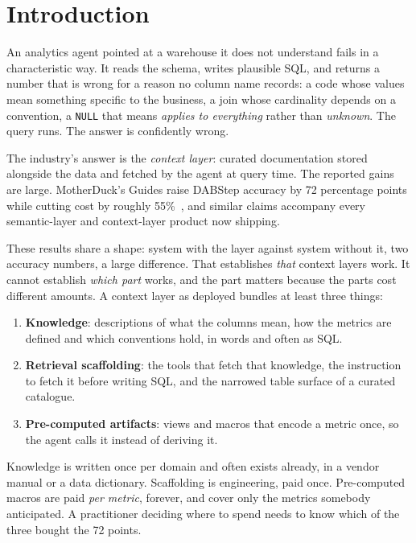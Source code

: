 \section{Introduction}
\label{sec:intro}

An analytics agent pointed at a warehouse it does not understand fails in a
characteristic way. It reads the schema, writes plausible SQL, and returns a
number that is wrong for a reason no column name records: a code whose values
mean something specific to the business, a join whose cardinality depends on a
convention, a \texttt{NULL} that means \emph{applies to everything} rather than
\emph{unknown}. The query runs. The answer is confidently wrong.

The industry's answer is the \emph{context layer}: curated documentation
stored alongside the data and fetched by the agent at query time. The reported
gains are large. MotherDuck's Guides raise DABStep accuracy by 72 percentage
points while cutting cost by roughly 55\%~\cite{motherduck-guides}, and
similar claims accompany every semantic-layer and context-layer product now
shipping.

These results share a shape: system with the layer against system without
it, two accuracy numbers, a large difference. That establishes \emph{that}
context layers work. It cannot establish \emph{which part} works, and the part
matters because the parts cost different amounts. A context layer as deployed
bundles at least three things:

\begin{enumerate}
\itemsep2pt
\item \textbf{Knowledge}: descriptions of what the columns mean, how
      the metrics are defined and which conventions hold, in words and
      often as SQL.
\item \textbf{Retrieval scaffolding}: the tools that fetch that knowledge, the
      instruction to fetch it before writing SQL, and the narrowed table
      surface of a curated catalogue.
\item \textbf{Pre-computed artifacts}: views and macros that encode a metric
      once, so the agent calls it instead of deriving it.
\end{enumerate}

Knowledge is written once per domain and often exists already, in a
vendor manual or a data dictionary. Scaffolding is engineering, paid once.
Pre-computed macros are paid \emph{per metric}, forever, and cover only the
metrics somebody anticipated. A practitioner deciding where to spend needs to
know which of the three bought the 72 points.

